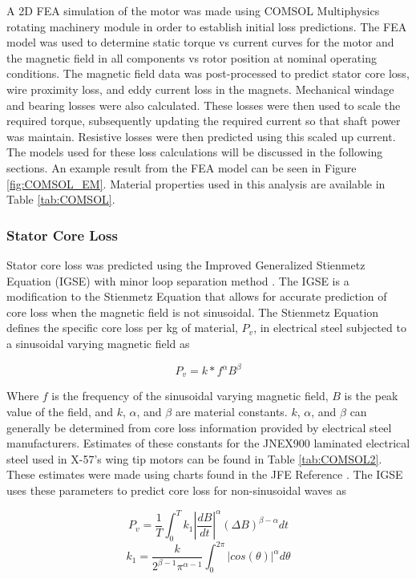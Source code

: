 \documentclass[]{aiaa-tc}%
\begin{document}
A 2D FEA simulation of the motor was made using COMSOL Multiphysics rotating machinery module in order to establish initial loss predictions. The FEA model was used to determine static torque vs current curves for the motor and the magnetic field in all components vs rotor position at nominal operating conditions. The magnetic field data was post-processed to predict stator core loss, wire proximity loss, and eddy current loss in the magnets. Mechanical windage and bearing losses were also calculated. These losses were then used to scale the required torque, subsequently updating the required current so that shaft power was maintain. Resistive losses were then predicted using this scaled up current. The models used for these loss calculations will be discussed in the following sections. An example result from the FEA model can be seen in Figure \ref{fig:COMSOL_EM}. Material properties used in this analysis are available in Table \ref{tab:COMSOL}.


\subsubsection{Stator Core Loss}
Stator core loss was predicted using the Improved Generalized Stienmetz Equation (IGSE) with minor loop separation method \cite{CoreLoss}. The IGSE is a modification to the Stienmetz Equation that allows for accurate prediction of core loss when the magnetic field is not sinusoidal. The Stienmetz Equation defines the specific core loss per kg of material, $P_{v}$, in electrical steel subjected to a sinusoidal varying magnetic field as

\begin{equation}
P_{v} = k*f^{\alpha}B^{\beta}
\label{eq:CoreLoss}
\end{equation}

Where $f$ is the frequency of the sinusoidal varying magnetic field, $B$ is the peak value of the field, 
and $k$, $\alpha$, and $\beta$ are material constants. $k$, $\alpha$, and $\beta$  
can generally be determined from core loss information provided by electrical steel manufacturers. 
Estimates of these constants for the JNEX900 laminated electrical steel used in X-57's wing tip motors can be found in Table \ref{tab:COMSOL2}. 
These estimates were made using charts found in the JFE Reference \cite{JFE}. The IGSE uses these parameters to predict core loss for non-sinusoidal waves as


\begin{equation}
P_{v} = \frac{1}{T}\int_{0}^{T}k_{1}|\frac{dB}{dt}|^{\alpha}(\Delta B)^{\beta-\alpha}dt
\label{eq:CoreLoss2}
\end{equation}
\begin{equation}
k_{1} = \frac{k}{2^{\beta-1}\pi^{\alpha-1}}\int_{0}^{2\pi}|cos(\theta)|^{\alpha}d\theta
\label{eq:CoreLoss2b}
\end{equation}
\end{document}
